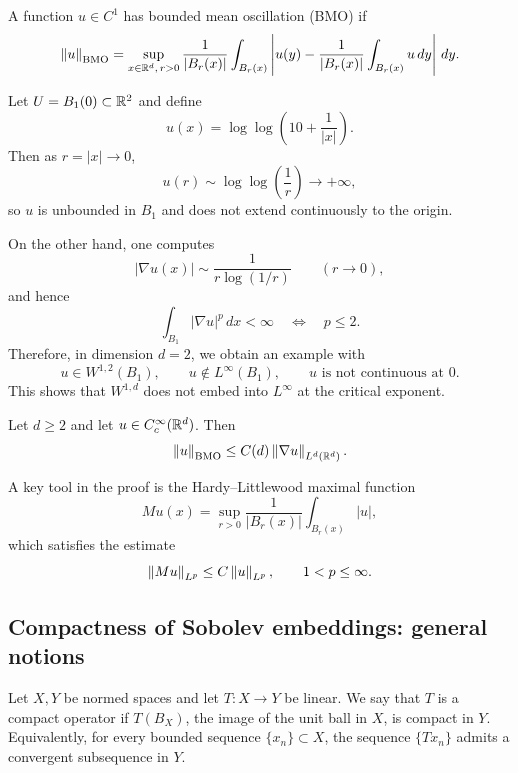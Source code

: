 \begin{definition}
A function $u\in C^1$ has bounded mean oscillation (BMO) if
\[
\left\lVert u \right\rVert_{\mathrm{BMO}}
=
\sup_{x\in \mathbb{R}^d,\,r>0}
\frac{1}{|B_r(x)|}
\int_{B_r(x)}
\left|u(y)-\frac{1}{|B_r(x)|}\int_{B_r(x)}u\,dy\right|\,dy.
\]
\end{definition}

\begin{example}
Let $U=B_1(0)\subset \mathbb{R}^2$ and define
\[
u(x)=\log\log\left(10+\frac{1}{|x|}\right).
\]
Then as $r=|x|\to 0$,
\[
u(r) \sim \log\log\left(\frac{1}{r}\right) \to +\infty,
\]
so $u$ is unbounded in $B_1$ and does not extend continuously to the origin.

On the other hand, one computes
\[
|\nabla u(x)| \sim \frac{1}{r\log(1/r)}
\qquad (r\to 0),
\]
and hence
\[
\int_{B_1} |\nabla u|^p \, dx < \infty
\quad \Longleftrightarrow \quad p\le 2.
\]
Therefore, in dimension $d=2$, we obtain an example with
\[
u \in W^{1,2}(B_1),
\qquad u\notin L^\infty(B_1),
\qquad u \text{ is not continuous at }0.
\]
This shows that $W^{1,d}$ does not embed into $L^\infty$ at the critical exponent.
\end{example}

\begin{theorem}
Let $d\ge 2$ and let $u\in C_c^\infty(\mathbb{R}^d)$. Then
\[
\left\lVert u \right\rVert_{\mathrm{BMO}} \le C(d)\left\lVert \nabla u \right\rVert_{L^d(\mathbb{R}^d)}.
\]
\end{theorem}

\begin{remark}
A key tool in the proof is the Hardy--Littlewood maximal function
\[
Mu(x)=\sup_{r>0} \frac{1}{|B_r(x)|}\int_{B_r(x)} |u|,
\]
which satisfies the estimate
\[
\left\lVert Mu \right\rVert_{L^p} \le C\left\lVert u \right\rVert_{L^p}, \qquad 1<p\le \infty.
\]
\end{remark}

\subsection{Compactness of Sobolev embeddings: general notions}

\begin{definition}
Let $X,Y$ be normed spaces and let $T:X\to Y$ be linear. We say that $T$ is a compact operator if $T(B_X)$, the image of the unit ball in $X$, is compact in $Y$. Equivalently, for every bounded sequence $\{x_n\}\subset X$, the sequence $\{Tx_n\}$ admits a convergent subsequence in $Y$.
\end{definition}

